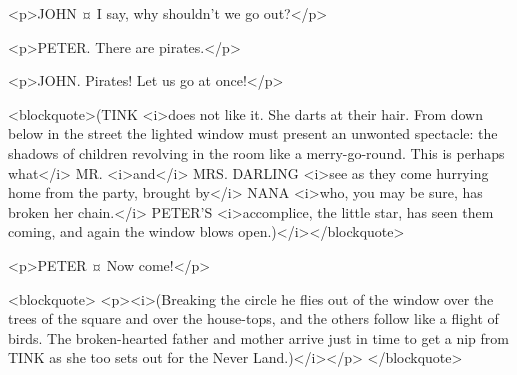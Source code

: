 <p>JOHN ¤
I say, why shouldn't we go out?</p>

<p>PETER. There are pirates.</p>

<p>JOHN. Pirates!
Let us go at once!</p>

<blockquote>(TINK <i>does not like it. She darts at their hair. From down below in the street the lighted window must present an unwonted spectacle: the shadows of children revolving in the room like a merry-go-round. This is perhaps what</i> MR. <i>and</i> MRS. DARLING <i>see as they come hurrying home from the party, brought by</i> NANA <i>who, you may be sure, has broken her chain.</i> PETER'S <i>accomplice, the little star, has seen them coming, and again the window blows open.)</i></blockquote>

<p>PETER ¤
Now come!</p>

<blockquote> <p><i>(Breaking the circle he flies out of the window over the trees of the square and over the house-tops, and the others follow like a flight of birds. The broken-hearted father and mother arrive just in time to get a nip from TINK as she too sets out for the Never Land.)</i></p> </blockquote>
